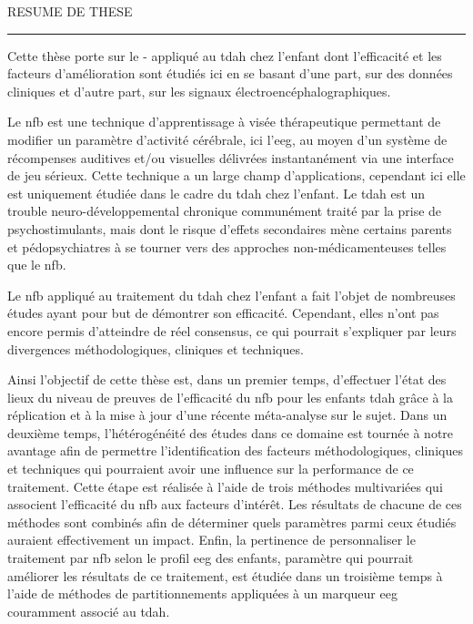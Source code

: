 
\begin{center}
\MakeUppercase{\LARGE{R}\Large{esume de these}} \\
\vspace{0mm}
\noindent\rule{16cm}{0.4pt}
\end{center}


Cette thèse porte sur le - appliqué au \gls{tdah} chez l'enfant dont l'efficacité et les facteurs d'amélioration sont 
étudiés ici en se basant d'une part, sur des données cliniques et d'autre part, sur les signaux électroencéphalographiques. 

Le \gls{nfb} est une technique d'apprentissage à visée thérapeutique permettant 
de modifier un paramètre d'activité cérébrale, ici l'\gls{eeg}, au moyen d’un système de récompenses auditives et/ou visuelles 
délivrées instantanément via une interface de jeu sérieux. Cette technique a un large champ d'applications, cependant ici elle est uniquement étudiée 
dans le cadre du \gls{tdah} chez l'enfant. Le \gls{tdah} est un trouble neuro-développemental chronique communément traité par la prise de psychostimulants, 
mais dont le risque d'effets secondaires mène certains parents et pédopsychiatres à se tourner vers des approches non-médicamenteuses telles que le \gls{nfb}.
 
Le \gls{nfb} appliqué au traitement du \gls{tdah} chez l'enfant a fait l’objet de nombreuses études ayant pour but de démontrer son efficacité. 
Cependant, elles n'ont pas encore permis d'atteindre de réel
consensus, ce qui pourrait s'expliquer par leurs divergences méthodologiques, cliniques et techniques. 

Ainsi l'objectif de cette thèse est, dans un premier temps, d'effectuer l'état des lieux du niveau de preuves de l'efficacité du \gls{nfb} pour les enfants \gls{tdah} grâce
à la réplication et à la mise à jour d'une récente méta-analyse sur le sujet. Dans un 
deuxième temps, l'hétérogénéité des études dans ce domaine est tournée à notre avantage afin de permettre 
l'identification des facteurs méthodologiques, cliniques et techniques qui pourraient avoir une influence sur la performance de ce traitement. Cette étape est réalisée
à l'aide de trois méthodes multivariées qui associent l'efficacité du \gls{nfb} aux facteurs d'intérêt. 
Les résultats de chacune de ces méthodes sont combinés afin de déterminer quels paramètres parmi ceux étudiés auraient effectivement un impact. 
Enfin, la pertinence de personnaliser le traitement par \gls{nfb} selon le profil \gls{eeg} des enfants, paramètre qui pourrait améliorer les résultats de ce traitement, est étudiée dans un troisième
temps à l'aide de méthodes de partitionnements appliquées à un marqueur \gls{eeg} couramment associé au \gls{tdah}. 


